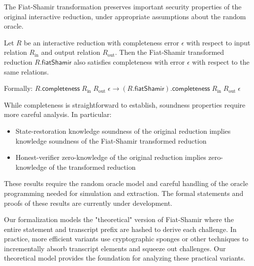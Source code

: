 The Fiat-Shamir transformation preserves important security properties of the original interactive reduction, under appropriate assumptions about the random oracle.

\begin{theorem}
    \label{thm:fiat_shamir_completeness}
    Let $R$ be an interactive reduction with completeness error $\epsilon$ with respect to input relation $R_{\text{in}}$ and output relation $R_{\text{out}}$. Then the Fiat-Shamir transformed reduction $R.\mathsf{fiatShamir}$ also satisfies completeness with error $\epsilon$ with respect to the same relations.

    Formally: $R.\mathsf{completeness} \;R_{\text{in}} \;R_{\text{out}} \;\epsilon \to (R.\mathsf{fiatShamir}).\mathsf{completeness} \;R_{\text{in}} \;R_{\text{out}} \;\epsilon$
\end{theorem}

\begin{remark}
    While completeness is straightforward to establish, soundness properties require more careful analysis. In particular:
    \begin{itemize}
        \item State-restoration knowledge soundness of the original reduction implies knowledge soundness of the Fiat-Shamir transformed reduction
        \item Honest-verifier zero-knowledge of the original reduction implies zero-knowledge of the transformed reduction
    \end{itemize}
    These results require the random oracle model and careful handling of the oracle programming needed for simulation and extraction. The formal statements and proofs of these results are currently under development.
\end{remark}

\begin{remark}
    Our formalization models the "theoretical" version of Fiat-Shamir where the entire statement and transcript prefix are hashed to derive each challenge. In practice, more efficient variants use cryptographic sponges or other techniques to incrementally absorb transcript elements and squeeze out challenges. Our theoretical model provides the foundation for analyzing these practical variants.
\end{remark}


